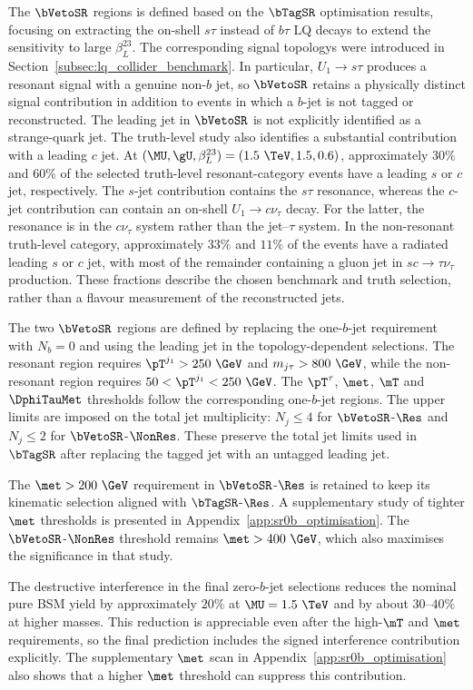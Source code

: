 The $\bVetoSR$ regions is defined based on the $\bTagSR$ optimisation results, focusing on extracting the on-shell $s\tau$ instead of $b\tau$ LQ decays to extend the sensitivity to large $\beta_L^{23}$.
The corresponding signal topologys were introduced in Section~\ref{subsec:lq_collider_benchmark}.
In particular, $U_1\to s\tau$ produces a resonant signal with a genuine non-$b$ jet, so $\bVetoSR$ retains a physically distinct signal contribution in addition to events in which a $b$-jet is not tagged or reconstructed.
The leading jet in $\bVetoSR$ is not explicitly identified as a strange-quark jet.
The truth-level study also identifies a substantial contribution with a leading $c$ jet.
At $(\MU,\gU,\beta_L^{23})=(1.5~\TeV,1.5,0.6)$, approximately $30\%$ and $60\%$ of the selected truth-level resonant-category events have a leading $s$ or $c$ jet, respectively.
The $s$-jet contribution contains the $s\tau$ resonance, whereas the $c$-jet contribution can contain an on-shell $U_1\to c\nu_\tau$ decay.
For the latter, the resonance is in the $c\nu_\tau$ system rather than the jet--$\tau$ system.
In the non-resonant truth-level category, approximately $33\%$ and $11\%$ of the events have a radiated leading $s$ or $c$ jet, with most of the remainder containing a gluon jet in $sc\to\tau\nu_\tau$ production.
These fractions describe the chosen benchmark and truth selection, rather than a flavour measurement of the reconstructed jets.

The two $\bVetoSR$ regions are defined by replacing the one-$b$-jet requirement with $N_b=0$ and using the leading jet in the topology-dependent selections.
The resonant region requires $\pT^{j_1}>250~\GeV$ and $m_{j\tau}>800~\GeV$, while the non-resonant region requires $50<\pT^{j_1}<250~\GeV$.
The $\pT^\tau$, $\met$, $\mT$ and $\DphiTauMet$ thresholds follow the corresponding one-$b$-jet regions.
The upper limits are imposed on the total jet multiplicity: $N_j\leq4$ for $\bVetoSR$-$\Res$ and $N_j\leq2$ for $\bVetoSR$-$\NonRes$.
These preserve the total jet limits used in $\bTagSR$ after replacing the tagged jet with an untagged leading jet.

The $\met>200~\GeV$ requirement in $\bVetoSR$-$\Res$ is retained to keep its kinematic selection aligned with $\bTagSR$-$\Res$.
A supplementary study of tighter $\met$ thresholds is presented in Appendix~\ref{app:sr0b_optimisation}.
The $\bVetoSR$-$\NonRes$ threshold remains $\met>400~\GeV$, which also maximises the significance in that study.

The destructive interference in the final zero-$b$-jet selections reduces the nominal pure BSM yield by approximately $20\%$ at $\MU=1.5~\TeV$ and by about $30$--$40\%$ at higher masses.
This reduction is appreciable even after the high-$\mT$ and $\met$ requirements, so the final prediction includes the signed interference contribution explicitly.
The supplementary $\met$ scan in Appendix~\ref{app:sr0b_optimisation} also shows that a higher $\met$ threshold can suppress this contribution.

